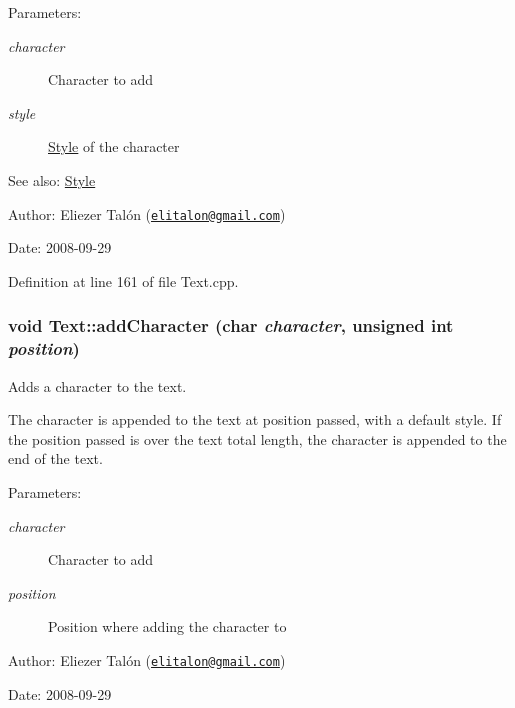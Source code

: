 \begin{Desc}
\item[Parameters:]
\begin{description}
\item[{\em character}]Character to add \item[{\em style}]\hyperlink{class_style}{Style} of the character\end{description}
\end{Desc}
\begin{Desc}
\item[See also:]\hyperlink{class_style}{Style}\end{Desc}
\begin{Desc}
\item[Author:]Eliezer Talón (\href{mailto:elitalon@gmail.com}{\tt elitalon@gmail.com}) \end{Desc}
\begin{Desc}
\item[Date:]2008-09-29 \end{Desc}


Definition at line 161 of file Text.cpp.\hypertarget{class_text_8e2f98d018b51a0b800bb1189ad7d9ae}{
\subsubsection[addCharacter]{\setlength{\rightskip}{0pt plus 5cm}void Text::addCharacter (char {\em character}, \/  unsigned int {\em position})}}
\label{class_text_8e2f98d018b51a0b800bb1189ad7d9ae}


Adds a character to the text. 

The character is appended to the text at position passed, with a default style. If the position passed is over the text total length, the character is appended to the end of the text.

\begin{Desc}
\item[Parameters:]
\begin{description}
\item[{\em character}]Character to add \item[{\em position}]Position where adding the character to\end{description}
\end{Desc}
\begin{Desc}
\item[Author:]Eliezer Talón (\href{mailto:elitalon@gmail.com}{\tt elitalon@gmail.com}) \end{Desc}
\begin{Desc}
\item[Date:]2008-09-29 \end{Desc}


